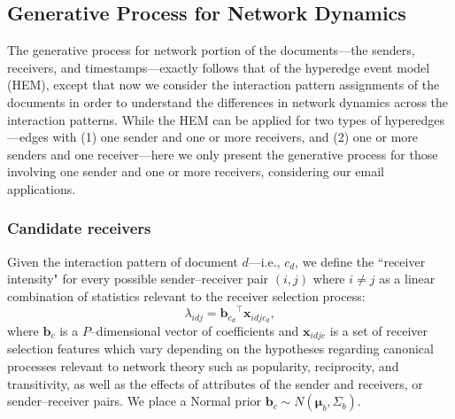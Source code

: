 \documentclass[ba]{imsart}
\numberwithin{equation}{section}
\theoremstyle{plain}
\begin{document}
\subsection{Generative Process for Network Dynamics}\label{subsec:Tie generating process}	
The generative process for network portion of the documents---the senders, receivers, and timestamps---exactly follows that of the hyperedge event model (HEM), except that now we consider the interaction pattern assignments of the documents in order to understand the differences in network dynamics across the interaction patterns.
While the HEM can be applied for two types of hyperedges---edges with (1) one sender and one or more receivers, and (2) one or more senders and one receiver---here we only present the generative process for those involving one sender and one or more receivers, considering our email applications. %
~
\subsubsection{Candidate receivers}\label{subsubsec: Tie}
	Given the interaction pattern of document $d$---i.e., $c_d$, we define the ``receiver intensity" for every possible sender--receiver pair $(i,j)$ where $i \!\neq\! j$ as a linear combination of statistics relevant to the receiver selection process:
	\begin{equation}
		\lambda_{idj} = {\boldsymbol{b}_{c_d}}^{\top}\boldsymbol{x}_{idj{c_d}},
	\end{equation}
	where $\boldsymbol{b}_c$ is a $P$--dimensional vector of coefficients and $\boldsymbol{x}_{idjc}$ is a set of receiver selection features which vary depending on the hypotheses regarding canonical processes relevant to network theory such as popularity, reciprocity, and transitivity, as well as the effects of attributes of the sender and receivers, or sender--receiver pairs. We place a Normal prior $\boldsymbol{b}_c \sim N(\boldsymbol{\mu}_b, \Sigma_b)$.~
	
\end{document}
